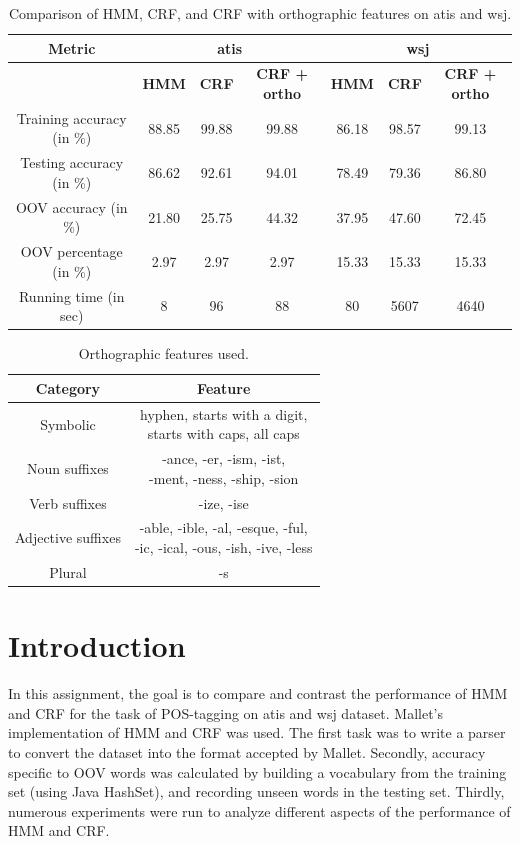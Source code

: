 \documentclass{sig-alternate-05-2015}
\begin{document}
\begin{table}[ht]
\centering
  \begin{tabular}{|c|c|c|c|c|c|c|}
  	\hline
  	{\bf Metric} & \multicolumn{3}{|c|}{atis} & \multicolumn{3}{|c|}{wsj} \\
	\hline 
  	& {\bf HMM} & {\bf CRF} & {\bf CRF + ortho} & {\bf HMM} & {\bf CRF} & {\bf CRF + ortho} \\
  	\hline
 	Training accuracy (in \%) & 88.85 & 99.88 & 99.88 & 86.18 & 98.57 & 99.13 \\
	Testing accuracy (in \%) & 86.62 & 92.61 & 94.01 & 78.49 & 79.36 & 86.80 \\
	OOV accuracy (in \%) & 21.80 & 25.75 & 44.32 & 37.95 & 47.60 & 72.45 \\
    OOV percentage (in \%) & 2.97 & 2.97 & 2.97 & 15.33 & 15.33 & 15.33 \\
    Running time (in sec) & 8 & 96 & 88 & 80 & 5607 & 4640 \\
  \hline
  \end{tabular}
\caption{Comparison of HMM, CRF, and CRF with orthographic features on atis and wsj.}
\label{table:compare}
\end{table}

\begin{table}[ht]
\centering
  \begin{tabular}{|c|c|}
  \hline
  {\bf Category} & {\bf Feature}\\
  \hline
  Symbolic & \shortstack {hyphen, starts with a digit, \\ starts with caps, all caps}\\
  \hline
  Noun suffixes & \shortstack{-ance, -er, -ism, -ist,\\ -ment, -ness, -ship, -sion} \\
    \hline
  Verb suffixes & -ize, -ise \\
    \hline
  Adjective suffixes & \shortstack{-able, -ible, -al, -esque, -ful,\\ -ic, -ical, -ous, -ish, -ive, -less} \\
  \hline
  Plural & -s\\
  \hline
  \end{tabular}
\caption{Orthographic features used.}
\label{table:ortho}
\end{table}

\section{Introduction}
In this assignment, the goal is to compare and contrast the performance of HMM and CRF for the task of POS-tagging on atis and wsj dataset. Mallet's implementation of HMM and CRF was used. The first task was to write a parser to convert the dataset into the format accepted by Mallet. Secondly, accuracy specific to OOV words was calculated by building a vocabulary from the training set (using Java HashSet), and recording unseen words in the testing set. Thirdly, numerous experiments were run to analyze different aspects of the performance of HMM and CRF.
\end{document}

